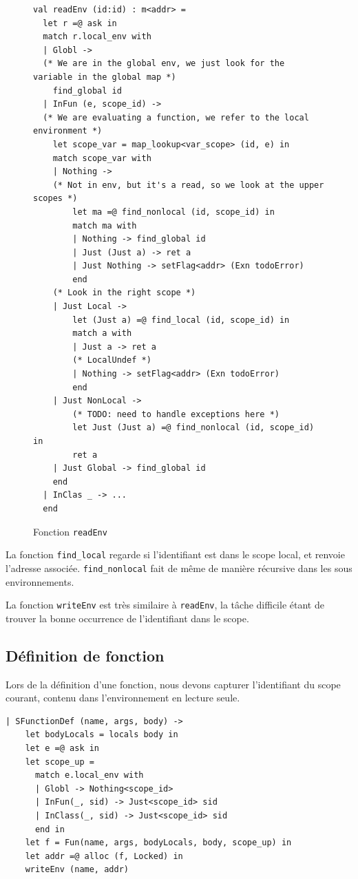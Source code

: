 \documentclass[a4paper, french, 11pt]{article}
\theoremstyle{break}
\begin{document}
\begin{figure}[h]
  \centering
  \begin{minipage}{\textwidth}
\begin{lstlisting}[style=myStyle, language=caml]
val readEnv (id:id) : m<addr> =
  let r =@ ask in
  match r.local_env with
  | Globl ->
  (* We are in the global env, we just look for the variable in the global map *)
    find_global id
  | InFun (e, scope_id) ->
  (* We are evaluating a function, we refer to the local environment *)
    let scope_var = map_lookup<var_scope> (id, e) in
    match scope_var with
    | Nothing ->
    (* Not in env, but it's a read, so we look at the upper scopes *)
        let ma =@ find_nonlocal (id, scope_id) in
        match ma with
        | Nothing -> find_global id
        | Just (Just a) -> ret a
        | Just Nothing -> setFlag<addr> (Exn todoError)
        end
    (* Look in the right scope *)
    | Just Local ->
        let (Just a) =@ find_local (id, scope_id) in
        match a with
        | Just a -> ret a
        (* LocalUndef *)
        | Nothing -> setFlag<addr> (Exn todoError)
        end
    | Just NonLocal ->
        (* TODO: need to handle exceptions here *)
        let Just (Just a) =@ find_nonlocal (id, scope_id) in
        ret a
    | Just Global -> find_global id
    end
  | InClas _ -> ...
  end
\end{lstlisting}
  \end{minipage}
  \caption{\label{readEnv}Fonction \texttt{readEnv}}
\end{figure}

La fonction \texttt{find\_local} regarde si l'identifiant est dans le scope local, et renvoie l'adresse associée. \texttt{find\_nonlocal} fait de même de manière récursive dans les sous environnements.

La fonction \texttt{writeEnv} est très similaire à \texttt{readEnv}, la tâche difficile étant de trouver la bonne occurrence de l'identifiant dans le scope.

\subsection{Définition de fonction}
Lors de la définition d'une fonction, nous devons capturer l'identifiant du scope courant, contenu dans l'environnement en lecture seule.
\begin{lstlisting}[style=myStyle, language=caml]
  | SFunctionDef (name, args, body) ->
    let bodyLocals = locals body in
    let e =@ ask in
    let scope_up =
      match e.local_env with
      | Globl -> Nothing<scope_id>
      | InFun(_, sid) -> Just<scope_id> sid
      | InClass(_, sid) -> Just<scope_id> sid
      end in
    let f = Fun(name, args, bodyLocals, body, scope_up) in
    let addr =@ alloc (f, Locked) in
    writeEnv (name, addr)
\end{lstlisting}
\end{document}
